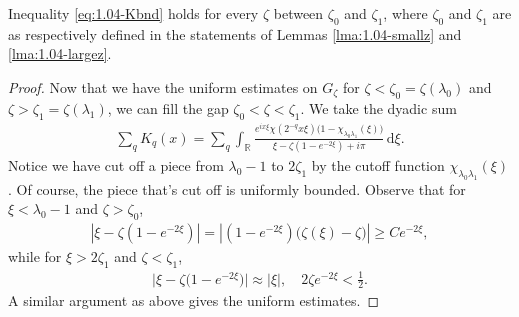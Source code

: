 \documentclass[../dissertation.tex]{subfiles}
\begin{document}
\begin{lma}%
	\label{lma:1.04-medz}
	Inequality \eqref{eq:1.04-Kbnd} holds for every $\zeta$ between 
	$\zeta_0$ and $\zeta_1$, where $\zeta_0$ and $\zeta_1$ are as respectively
	defined in the statements of Lemmas \ref{lma:1.04-smallz} and \ref{lma:1.04-largez}.
\end{lma}
\begin{proof}
	Now that we have the uniform estimates on $G_\zeta$ for 
	$\zeta < \zeta_0 = \zeta(\lambda_0)$ and $\zeta > \zeta_1 = \zeta(\lambda_1)$, 
	we can fill the gap $\zeta_0 < \zeta < \zeta_1$. We take the dyadic sum
	\begin{align}
		\sum_q K_q(x) 
			= \sum_q 
				\int_{\mathbb R} 
					\frac{
						e^{ix\xi}\chi\left(2^{-q}x\xi\right)
						\big(1-\chi_{\lambda_0 \lambda_1}(\xi)\big)
					}
					{\xi - \zeta\left(1-e^{-2\xi}\right) + i \pi}
				\, \mathrm{d}\xi.
	\end{align}
	Notice we have cut off a piece from $\lambda_0-1$ to $2\zeta_1$ by the 
	cutoff function 
	$\chi_{\lambda_0\lambda_1}(\xi)$. Of course, the piece that's cut off is uniformly 
	bounded. Observe that for $\xi<\lambda_0-1$ and $\zeta>\zeta_0$, 
	\begin{align*}
		\left|\xi-\zeta\left(1-e^{-2\xi}\right)\right|
			= \left|\left(1-e^{-2\xi}\right)\big(\zeta(\xi)-\zeta\big)\right|
			\ge Ce^{-2\xi},
	\end{align*}
	while for $\xi>2\zeta_1$ and $\zeta<\zeta_1$,
	\begin{align*}
		\big|\xi-\zeta\big(1-e^{-2\xi}\big)\big| 
			\approx |\xi|, \quad 2\zeta e^{-2\xi}<\frac12.
	\end{align*}
	A similar argument as above gives the uniform estimates.
\end{proof}
\end{document}
